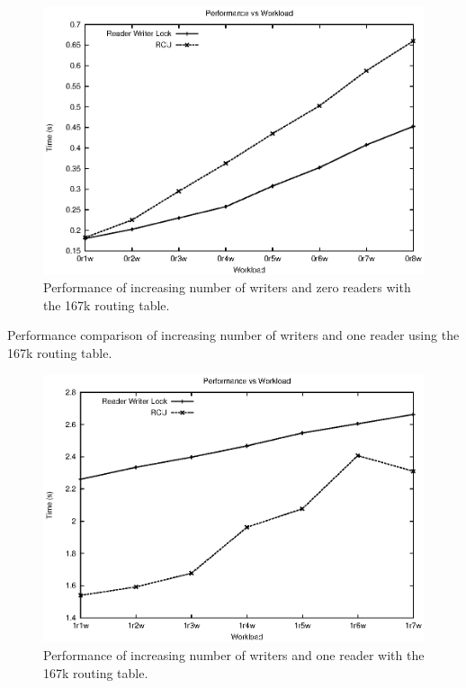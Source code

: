 \documentclass[a4paper,marginparwidth=50pt,marginparsep=10pt]{article}
\begin{document}
\begin{figure}[tph]
\includegraphics[scale = 0.7]{../images/graphs/macro_0r_vw}
\caption{Performance of increasing number of writers and zero readers with the 167k routing table.}
\label{img:macro_0r_vw}
\end{figure}


\begin{table}[tph]
\begin{center}

\end{center}
\caption{Performance comparison of increasing number of writers and one reader using the 167k routing table.}
\label{tbl:macro_1r_vw}
\end{table}


\begin{figure}[tph]
\includegraphics[scale = 0.7]{../images/graphs/macro_1r_vw}
\caption{Performance of increasing number of writers and one reader with the 167k routing table.}
\label{img:macro_1r_vw}
\end{figure}
\end{document}
